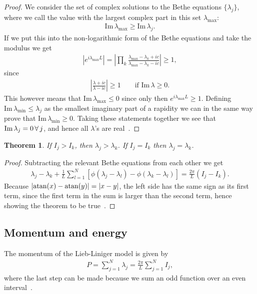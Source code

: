 \documentclass[11pt, a4paper]{report} %
\newtheorem{theorem}{Theorem}
\begin{document}
\begin{proof}
We consider the set of complex solutions to the Bethe equations \(\{\lambda_j\}\), where we call the value with the largest complex part in this set \(\lambda_{\max}\):
\begin{align}
\textrm{Im} \, \lambda_{\max} \geq \textrm{Im} \, \lambda_j.
\end{align}
If we put this into the non-logarithmic form of the Bethe equations and take the modulus we get
\begin{align}
  \left| e^{i\lambda_{\max} L} \right|= \left| \prod_k \frac{\lambda_{\max} - \lambda_k + ic}{\lambda_{\max} - \lambda_k - ic} \right|\geq 1,
\end{align}
since
\begin{align}
\left|\frac{\lambda+ic}{\lambda-ic} \right| \geq 1 \qquad \textrm{if Im}\, \lambda \geq 0.
\end{align}
This however means that \(\textrm{Im}\, \lambda_{\max} \leq 0\) since only then \(e^{i\lambda_{\max}L} \geq 1\).
Defining \(\textrm{Im}\,\lambda_{\min}\leq \lambda_j\) as the smallest imaginary part of a rapidity we can in the same way prove that \(\textrm{Im}\,\lambda_{\min} \geq 0\).
Taking these statements together we see that \(\textrm{Im}\, \lambda_{j}=0\textrm{\,}\forall\textrm{\,} j\), and hence all  \(\lambda\)'s are real~\cite{Korepin1993}.
\end{proof}

\begin{theorem}
If \(I_j >I_k\), then \(\lambda_j > \lambda_k\). If \(I_j=I_k\) then \(\lambda_j=\lambda_k\).
\end{theorem}

\begin{proof}
Subtracting the relevant Bethe equations from each other we get
\begin{align}
  \lambda_j - \lambda_k + \frac{1}{L}\sum_{l=1}^N \left[\phi(\lambda_j - \lambda_l) - \phi(\lambda_k - \lambda_l)\right] = \frac{2\pi}{L} (I_j - I_k).
\end{align}
Because \(\lvert\atan(x)-\atan(y)\rvert=\lvert x-y\rvert\), the left side has the same sign as its first term, since the first term in the sum is larger than the second term, hence showing the theorem to be true~\cite{Korepin1993,Gaudin2009}.
\end{proof}

\subsection{Momentum and energy}
The momentum of the Lieb-Liniger model is given by
\begin{align}
  P = \sum_{j=1}^N \lambda_j = \frac{2\pi}{L}\sum_{j=1}^N I_j,
\end{align}
where the last step can be made because we sum an odd function over an even interval~\cite{Korepin1993}.
\end{document}

